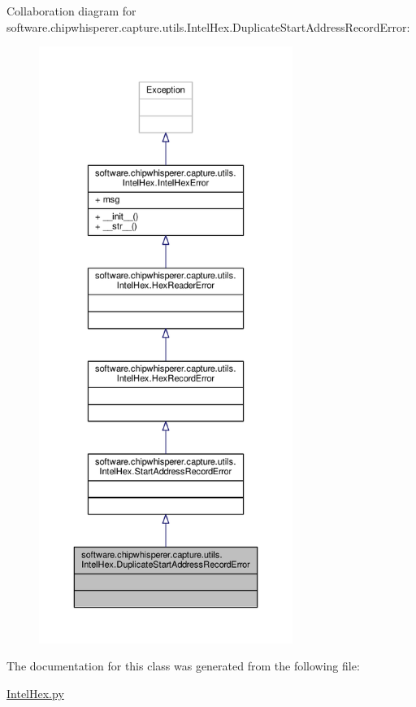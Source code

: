 Collaboration diagram for software.\+chipwhisperer.\+capture.\+utils.\+Intel\+Hex.\+Duplicate\+Start\+Address\+Record\+Error\+:\nopagebreak
\begin{figure}[H]
\begin{center}
\leavevmode
\includegraphics[height=550pt]{d8/d9b/classsoftware_1_1chipwhisperer_1_1capture_1_1utils_1_1IntelHex_1_1DuplicateStartAddressRecordError__coll__graph}
\end{center}
\end{figure}


The documentation for this class was generated from the following file\+:\begin{DoxyCompactItemize}
\item 
\hyperlink{IntelHex_8py}{Intel\+Hex.\+py}\end{DoxyCompactItemize}
